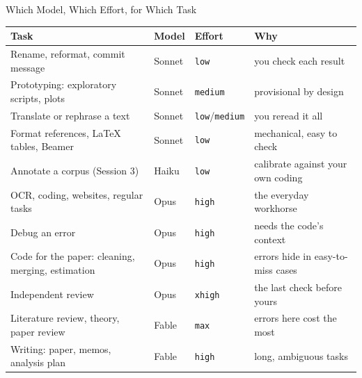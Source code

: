\documentclass[svgnames,x11names,dvipsnames]{beamer}
\newcommand{\chg}[1]{{\bfseries #1}}
\renewcommand{\chg}[1]{#1}
\begin{document}
\begin{frame}{Which Model, Which Effort, for Which Task}

\centering
{\scriptsize
\renewcommand{\arraystretch}{1.1}
\setlength{\tabcolsep}{4pt}
\begin{tabular}{@{}>{\raggedright\arraybackslash}p{3.6cm}l>{\raggedright\arraybackslash}p{1.6cm}>{\raggedright\arraybackslash}p{3.4cm}@{}}
\toprule
\textbf{Task} & \textbf{Model} & \textbf{Effort} & \textbf{Why} \\
\midrule
Rename, reformat, commit message & Sonnet & \texttt{low} & you check each result \\
Prototyping: exploratory scripts, plots & Sonnet & \texttt{medium} & provisional by design \\
\chg{Translate or rephrase a text} & \chg{Sonnet} & \chg{\texttt{low}/\texttt{medium}} & \chg{you reread it all} \\
\chg{Format references, LaTeX tables, Beamer} & \chg{Sonnet} & \chg{\texttt{low}} & \chg{mechanical, easy to check} \\
\chg{Annotate a corpus (Session 3)} & \chg{Haiku} & \chg{\texttt{low}} & \chg{calibrate against your own coding} \\
\chg{OCR, coding, websites, regular tasks} & \chg{Opus} & \chg{\texttt{high}} & \chg{the everyday workhorse} \\
\chg{Debug an error} & \chg{Opus} & \chg{\texttt{high}} & \chg{needs the code's context} \\
Code for the paper: cleaning, merging, estimation & Opus & \texttt{high} & errors hide in easy-to-miss cases \\
Independent review & Opus & \texttt{xhigh} & the last check before yours \\
\chg{Literature review, theory, paper review} & \chg{Fable} & \chg{\texttt{max}} & \chg{errors here cost the most} \\
Writing: paper, memos, analysis plan & Fable & \texttt{high} & long, ambiguous tasks \\
\bottomrule
\end{tabular}}

\end{frame}
\end{document}
